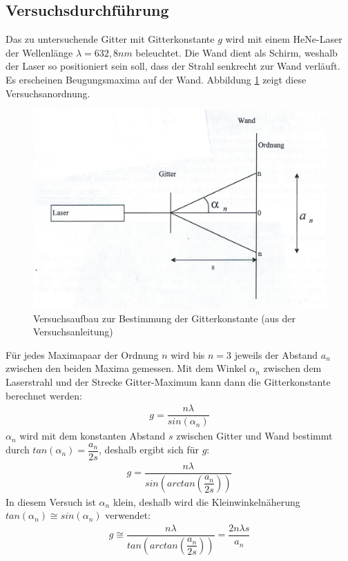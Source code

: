 \documentclass{scrartcl}
\begin{document}
\subsection{Versuchsdurchführung}
Das zu untersuchende Gitter mit Gitterkonstante $g$ wird mit einem HeNe-Laser der Wellenlänge $\lambda = 632,8nm$ beleuchtet. Die Wand dient als Schirm, weshalb der Laser so positioniert sein soll, dass der Strahl senkrecht zur Wand verläuft. Es erscheinen Beugungsmaxima auf der Wand. Abbildung \ref{fig:Gitter} zeigt diese Versuchsanordnung.
\begin{figure}[H]
  \centering
    \includegraphics[scale=0.75]{BeugungGitter.PNG}
  \caption{Versuchsaufbau zur Bestimmung der Gitterkonstante (aus der Versuchsanleitung)}
  \label{fig:Gitter}
\end{figure}
Für jedes Maximapaar der Ordnung $n$ wird bis $n = 3$ jeweils der Abstand $a_{n}$ zwischen den beiden Maxima gemessen. Mit dem Winkel $\alpha_{n}$ zwischen dem Laserstrahl und der Strecke Gitter-Maximum kann dann die Gitterkonstante berechnet werden:
\begin{align}
g = \dfrac{n \lambda}{sin \left( \alpha_{n} \right) }
\end{align}
$\alpha_{n}$ wird mit dem konstanten Abstand $s$ zwischen Gitter und Wand bestimmt durch $tan (\alpha_{n}) = \dfrac{a_{n}}{2s}$, deshalb ergibt sich für $g$:
\begin{align}
g = \dfrac{n \lambda}{sin \left( arctan \left( \dfrac{a_{n}}{2s} \right) \right) }
\label{eq:Gitter1}
\end{align}
In diesem Versuch ist $\alpha_{n}$ klein, deshalb wird die Kleinwinkelnäherung $tan (\alpha_{n}) \cong sin (\alpha_{n})$ verwendet:
\begin{align}
g \cong \dfrac{n \lambda}{tan \left( arctan \left( \dfrac{a_{n}}{2s} \right) \right) } = \dfrac{2n \lambda s}{a_{n}}
\label{eq:Gitter2}
\end{align}
\end{document}
